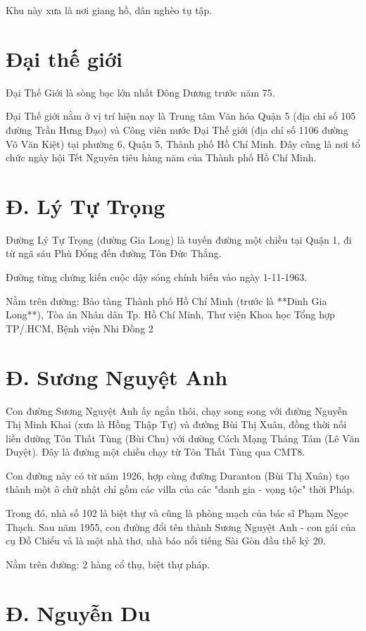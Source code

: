 Khu này xưa là nơi giang hồ, dân nghèo tụ tập.

\section{Đại thế giới}

Đại Thế Giới là sòng bạc lớn nhất Đông Dương trước năm 75.

Đại Thế giới nằm ở vị trí hiện nay là Trung tâm Văn hóa Quận 5 (địa chỉ số 105 đường Trần Hưng Đạo) và Công viên nước Đại Thế giới (địa chỉ số 1106 đường Võ Văn Kiệt) tại phường 6, Quận 5, Thành phố Hồ Chí Minh. Đây cũng là nơi tổ chức ngày hội Tết Nguyên tiêu hàng năm của Thành phố Hồ Chí Minh.

\section{Đ. Lý Tự Trọng}

Đường Lý Tự Trọng (đường Gia Long) là tuyến đường một chiều tại Quận 1, đi từ ngã sáu Phù Đổng đến đường Tôn Đức Thắng.

Đường từng chứng kiến cuộc dậy sóng chính biến vào ngày 1-11-1963.

Nằm trên đường: Bảo tàng Thành phố Hồ Chí Minh (trước là **Dinh Gia Long**), Tòa án Nhân dân Tp. Hồ Chí Minh, Thư viện Khoa học Tổng hợp TP/.HCM, Bệnh viện Nhi Đồng 2

\section{Đ. Sương Nguyệt Anh}

Con đường Sương Nguyệt Anh ấy ngắn thôi, chạy song song với đường Nguyễn Thị Minh Khai (xưa là Hồng Thập Tự) và đường Bùi Thị Xuân, đồng thời nối liền đường Tôn Thất Tùng (Bùi Chu) với đường Cách Mạng Tháng Tám (Lê Văn Duyệt). Đây là đường một chiều chạy từ Tôn Thất Tùng qua CMT8.

 Con đường này có từ năm 1926, hợp cùng đường Duranton (Bùi Thị Xuân) tạo thành một ô chữ nhật chỉ gồm các villa của các "danh gia - vọng tộc" thời Pháp.

Trong đó, nhà số 102 là biệt thự và cũng là phòng mạch của bác sĩ Phạm Ngọc Thạch. Sau năm 1955, con đường đổi tên thành Sương Nguyệt Anh - con gái của cụ Đồ Chiểu và là một nhà thơ, nhà báo nổi tiếng Sài Gòn đầu thế kỷ 20.

 Nằm trên đường: 2 hàng cổ thụ, biệt thự pháp.

\section{Đ. Nguyễn Du}

